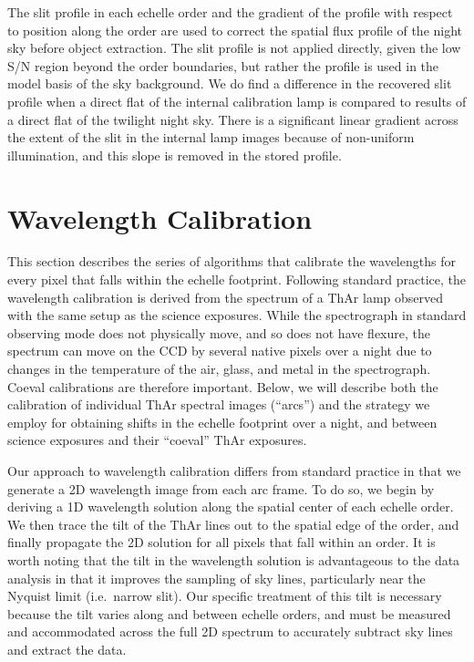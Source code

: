 \documentclass[]{emulateapj}
\begin{document}
The slit profile in each echelle order 
and the gradient of the profile with respect to position along the order
are used to correct the spatial flux profile of the night sky before 
object extraction.
The slit profile is not applied directly, given the low S/N region beyond 
the order boundaries, but rather the profile is used in the model basis 
of the sky background.  We do find a difference in the recovered slit profile
when a direct flat of the internal calibration lamp is compared
to results of a direct flat of the twilight night sky.  There is a significant
linear gradient across the extent of the slit in the internal lamp images
because of non-uniform illumination, and
this slope is removed in the stored profile.


\section{Wavelength Calibration}
\label{sec:wave}

This section describes the series of algorithms that calibrate the
wavelengths for every pixel that falls within the
echelle footprint.  Following standard practice, the wavelength
calibration is derived from the spectrum of a ThAr lamp observed with
the same setup as the science exposures.  While the
spectrograph in standard observing mode does not physically move, and so
does not have flexure, the spectrum can move on the CCD by several
native pixels over a night due to changes in the temperature of the
air, glass, and metal in the spectrograph.  Coeval calibrations are
therefore important.  Below, we will describe both the calibration of
individual ThAr spectral images (``arcs'') and the strategy we employ for obtaining
shifts in the echelle footprint over a night, and between 
science exposures and their ``coeval'' ThAr exposures.

Our approach to wavelength calibration differs from standard practice
in that we generate a 2D wavelength image from each arc frame.  To do
so, we begin by deriving a 1D wavelength solution along the spatial
center of each echelle order.  We then trace the tilt of the ThAr lines
out to the spatial edge of the order, and finally propagate the 2D
solution for all pixels that fall within an order.  It is worth noting
that the tilt in the wavelength solution is advantageous to the data
analysis in that it improves the sampling of sky lines, particularly
near the Nyquist limit (i.e.\ narrow slit).  Our specific treatment
of this tilt is necessary because the tilt varies along and between
echelle orders, and must be measured and accommodated across the full 2D
spectrum to accurately subtract  sky lines and 
extract the data.
\end{document}
